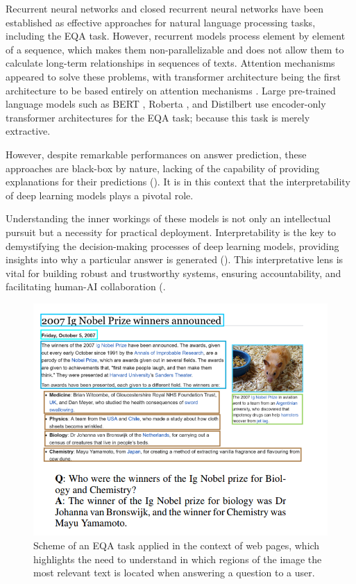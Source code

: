 Recurrent neural networks and closed recurrent neural networks have been established as effective approaches for natural language processing tasks, including the EQA task. However, recurrent models process element by element of a sequence, which makes them non-parallelizable and does not allow them to calculate long-term relationships in sequences of texts. Attention mechanisms appeared to solve these problems, with transformer architecture being the first architecture to be based entirely on attention mechanisms \cite{pearce2021comparative}. Large pre-trained language models such as BERT \cite{devlin2018bert}, Roberta \cite{liu2019roberta}, and Distilbert \cite{sanh2019distilbert} use encoder-only transformer architectures for the EQA task; because this task is merely extractive. 


However, despite remarkable performances on answer prediction, these approaches are black-box by nature, lacking of the capability of providing explanations for their predictions (\cite{thayaparan2020explanationlp}). It is in this context that the interpretability of deep learning models plays a pivotal role.

Understanding the inner workings of these models is not only an intellectual pursuit but a necessity for practical deployment. Interpretability is the key to demystifying the decision-making processes of deep learning models, providing insights into why a particular answer is generated (\cite{dao2020demystifying}). This interpretative lens is vital for building robust and trustworthy systems, ensuring accountability, and facilitating human-AI collaboration (\cite{caldwell2022agile}.

\begin{figure}[h!]
    \centering%
    \includegraphics[width=\linewidth]{Figures/Preliminares/visualmrc_example.png}
    \caption{Scheme of an EQA task applied in the context of web pages, which highlights the need to understand in which regions of the image the most relevant text is located when answering a question to a user.}
    \label{fig:example_vmrc}
\end{figure}

